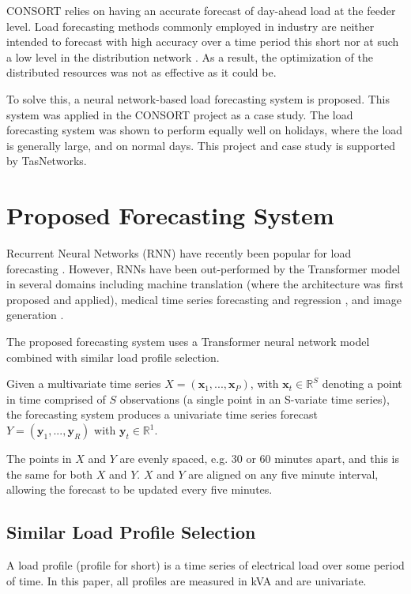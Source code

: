 \documentclass[conference]{IEEEtran}
\begin{document}
CONSORT relies on having an accurate forecast of day-ahead load at the feeder level.
Load forecasting methods commonly employed in industry are neither intended to forecast with high accuracy over a time period this short nor at such a low level in the distribution network \cite{CIGRE2016}.
As a result, the optimization of the distributed resources was not as effective as it could be.
\par
To solve this, a neural network-based load forecasting system is proposed.
This system was applied in the CONSORT project as a case study.
The load forecasting system was shown to perform equally well on holidays, where the load is generally large, and on normal days. 
This project and case study is supported by TasNetworks.


\section{Proposed Forecasting System}
Recurrent Neural Networks (RNN) have recently been popular for load forecasting \cite{Kong2018}.
However, RNNs have been out-performed by the Transformer \cite{Vaswani2017} model in several domains including machine translation \cite{Vaswani2017} (where the architecture was first proposed and applied), medical time series forecasting and regression \cite{Song2017}, and image generation \cite{Parmar2018}.
\par
The proposed forecasting system uses a Transformer neural network model combined with similar load profile selection.
\par
Given a multivariate time series $X = (\boldsymbol{x}_1, ..., \boldsymbol{x}_P)$, with $\boldsymbol{x}_t \in \mathbb{R}^S$ denoting a point in time comprised of $S$ observations (a single point in an S-variate time series), the forecasting system produces a univariate time series forecast $Y = (\boldsymbol{y}_1, ..., \boldsymbol{y}_R)$ with $\boldsymbol{y}_t \in \mathbb{R}^1$.
\par
The points in $X$ and $Y$ are evenly spaced, e.g. 30 or 60 minutes apart, and this is the same for both $X$ and $Y$.
$X$ and $Y$ are aligned on any five minute interval, allowing the forecast to be updated every five minutes.


\subsection{Similar Load Profile Selection}
A load profile (profile for short) is a time series of electrical load over some period of time.
In this paper, all profiles are measured in kVA and are univariate. 
\end{document}

